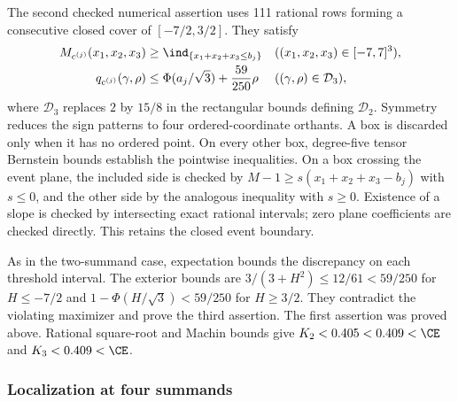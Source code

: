 The second checked numerical assertion uses 111 rational rows forming a consecutive closed cover of
$[-7/2,3/2]$. They satisfy
\begin{align*}
 M_{c^{(j)}}(x_1,x_2,x_3)&\ge\ind_{\{x_1+x_2+x_3\le b_j\}}
                    &&((x_1,x_2,x_3)\in[-7,7]^3),\\
 q_{c^{(j)}}(\gamma,\rho)&\le\Phi(a_j/\sqrt3)+\frac{59}{250}\rho
                    &&((\gamma,\rho)\in\mathcal D_3),
\end{align*}
where $\mathcal D_3$ replaces $2$ by $15/8$ in the rectangular
bounds defining $\mathcal D_2$.
Symmetry reduces the sign patterns to four ordered-coordinate
orthants.  A box is discarded only when it has no ordered point.
On every other box, degree-five tensor Bernstein bounds establish
the pointwise inequalities.  On a box crossing the event plane,
the included side is checked by $M-1\ge s(x_1+x_2+x_3-b_j)$ with
$s\le0$, and the other side by the analogous inequality with $s\ge0$.
Existence of a slope is checked by intersecting exact rational intervals;
zero plane coefficients are checked directly.  This retains the closed
event boundary.

As in the two-summand case, expectation bounds the discrepancy on each
threshold interval.  The exterior bounds are
$3/(3+H^2)\le12/61<59/250$ for $H\le-7/2$ and
$1-\Phi(H/\sqrt3)<59/250$ for $H\ge3/2$.
They contradict the violating maximizer and prove the third assertion.
The first assertion was proved above.  Rational square-root and Machin
bounds give $K_2<0.405<0.409<\CE$ and $K_3<0.409<\CE$.

\subsubsection{Localization at four summands}
\label{j:finite:n4-localization-section}

